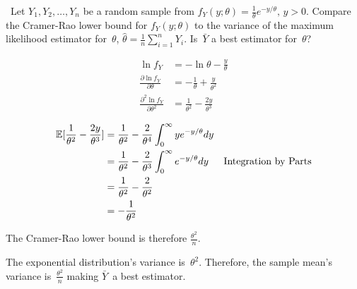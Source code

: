\begin{problem}
  ~Let ${Y_1,Y_2,\ldots,Y_n}$ be a random sample from ${f_{Y}(y;\theta) = \frac{1}{\theta} e^{-y/\theta}\text{, } y > 0}$.  Compare the Cramer-Rao lower bound for ${f_{Y}(y;\theta)}$ to the variance of the maximum likelihood estimator for~$\theta$, ${\hat{\theta} = \frac{1}{n}\sum_{i=1}^{n}Y_i}$. Is~$\bar{Y}$ a best estimator for~$\theta$?
\end{problem}

\begin{align}
  \ln f_Y &= -\ln\theta - \frac{y}{\theta} \\
  \frac{\partial \ln f_Y}{\partial \theta} &= -\frac{1}{\theta} + \frac{y}{\theta^2} \\
  \frac{\partial^{2} \ln f_Y}{\partial \theta^{2}} &= \frac{1}{\theta^2} - \frac{2y}{\theta^3}
\end{align}

\begin{align}
  \mathbb{E}\lbrack\frac{1}{\theta^2} - \frac{2y}{\theta^3}\rbrack &= \frac{1}{\theta^2} - \frac{2}{\theta^4} \int_{0}^{\infty} ye^{-y/\theta} dy \\
                                                    &= \frac{1}{\theta^2} - \frac{2}{\theta^3} \int_{0}^{\infty} e^{-y/\theta} dy  & \text{Integration by Parts} \\
                                                    &= \frac{1}{\theta^2} - \frac{2}{\theta^2} \\
                                                    &= - \frac{1}{\theta^2}
\end{align}

The Cramer-Rao lower bound is therefore ${\boxed{\frac{\theta^2}{n}}}$.

The exponential distribution's variance is~$\theta^2$.  Therefore, the sample mean's variance is~$\frac{\theta^2}{n}$ making $\bar{Y}$~a best estimator.
